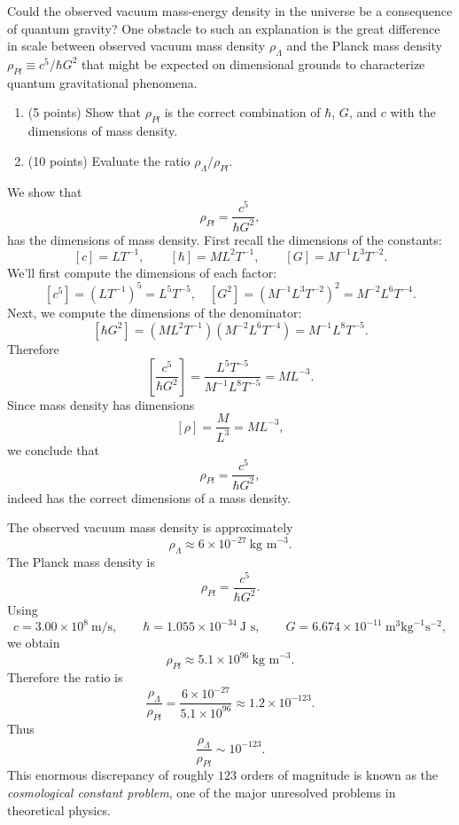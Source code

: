 \begin{problem}
  Could the observed vacuum mass-energy density in the universe be a consequence of quantum gravity? One obstacle to such an explanation is the great difference in scale between observed vacuum mass density $\rho_\Lambda$ and the Planck mass density $\rho_{Pl} \equiv c^5/\hbar G^2$ that might be expected on dimensional grounds to characterize quantum gravitational phenomena.
  \begin{enumerate}
    \item (5 points) Show that $\rho_{Pl}$ is the correct combination of $\hbar$, $G$, and $c$ with the dimensions of mass density.
    \item (10 points) Evaluate the ratio $\rho_\Lambda/\rho_{Pl}$.
  \end{enumerate}
\end{problem}

\begin{solution}[(i)]
  We show that
  \[%
    \rho_{Pl} = \frac{c^5}{\hbar G^2}
  ,\]%
  has the dimensions of mass density. First recall the dimensions of the constants:
  \[%
    [c] = L T^{-1}, \qquad [\hbar] = M L^2 T^{-1}, \qquad [G] = M^{-1} L^3 T^{-2}
  .\]%
  We'll first compute the dimensions of each factor:
  \[%
    [c^5] = (L T^{-1})^5 = L^5 T^{-5}, \quad [G^2] = (M^{-1} L^3 T^{-2})^2 = M^{-2} L^6 T^{-4}
  .\]%
  Next, we compute the dimensions of the denominator:
  \[%
    [\hbar G^2] = (M L^2 T^{-1})(M^{-2} L^6 T^{-4}) = M^{-1} L^8 T^{-5}
  .\]%
  Therefore
  \[%
    \left[\frac{c^5}{\hbar G^2}\right] = \frac{L^5 T^{-5}}{M^{-1} L^8 T^{-5}} = M L^{-3}
  .\]%
  Since mass density has dimensions
  \[%
    [\rho] = \frac{M}{L^3} = M L^{-3}
  ,\]%
  we conclude that
  \[%
    \rho_{Pl} = \frac{c^5}{\hbar G^2}
  ,\]%
  indeed has the correct dimensions of a mass density.
\end{solution}

\begin{solution}[(ii)]
  The observed vacuum mass density is approximately
  \[%
    \rho_\Lambda \approx 6 \times 10^{-27} \ \text{kg m}^{-3}
  .\]%
  The Planck mass density is
  \[%
    \rho_{Pl} = \frac{c^5}{\hbar G^2}
  .\]%
  Using
  \[%
    c = 3.00 \times 10^8 \ \text{m/s}, \qquad \hbar = 1.055 \times 10^{-34} \ \text{J s}, \qquad G = 6.674 \times 10^{-11} \ \text{m}^3 \text{kg}^{-1} \text{s}^{-2}
  ,\]%
  we obtain
  \[%
    \rho_{Pl} \approx 5.1 \times 10^{96} \ \text{kg m}^{-3}
  .\]%
  Therefore the ratio is
  \[%
    \frac{\rho_\Lambda}{\rho_{Pl}} = \frac{6 \times 10^{-27}}{5.1 \times 10^{96}} \approx 1.2 \times 10^{-123}
  .\]%
  Thus
  \[%
    \frac{\rho_\Lambda}{\rho_{Pl}} \sim 10^{-123}
  .\]%
  This enormous discrepancy of roughly $123$ orders of magnitude is known as the \emph{cosmological constant problem}, one of the major unresolved problems in theoretical physics.
\end{solution}

